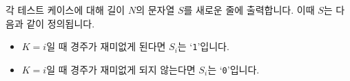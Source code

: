 각 테스트 케이스에 대해 길이 $N$의 문자열 $S$를 새로운 줄에 출력합니다. 이때 $S$는 다음과 같이 정의됩니다.

\begin{itemize}
\item $K=i$일 때 경주가 재미없게 된다면 $S_i$는 `\texttt{1}'입니다.
\item $K=i$일 때 경주가 재미없게 되지 않는다면 $S_i$는 `\texttt{0}'입니다.
\end{itemize}